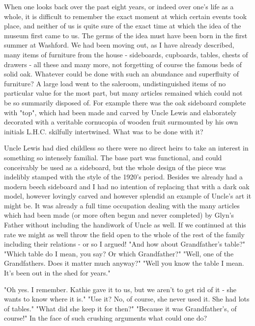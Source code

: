 
When one looks back over the past eight years, or indeed over one's life as a whole, it is difficult to remember the exact moment at which certain events took place, and neither of us is quite sure of the exact time at which the idea of the museum first came to us. The germs of the idea must have been born in the first summer at Washford. We had been moving out, as I have already described, many items of furniture from the house - sideboards, cupboards, tables, chests of drawers - all these and many more, not forgetting of course the famous beds of solid oak. Whatever could be done with such an abundance and superfluity of furniture? A large load went to the saleroom, undistinguished items of no particular value for the most part, but many articles remained which could not be so summarily disposed of. For example there was the oak sideboard complete with "top", which had been made and carved by Uncle Lewis and elaborately decorated with a veritable cornucopia of wooden fruit surmounted by his own initials L.H.C. skilfully intertwined. What was to be done with it?

Uncle Lewis had died childless so there were no direct heirs to take an interest in something so intensely familial. The base part was functional, and could conceivably be used as a sideboard, but the whole design of the piece was indelibly stamped with the style of the 1920's period. Besides we already had a modern beech sideboard and I had no intention of replacing that with a dark oak model, however lovingly carved and however splendid an example of Uncle's art it might be. It was already a full time occupation dealing with the many articles which had been made (or more often begun and never completed) by Glyn's Father without including the handiwork of Uncle as well. If we continued at this rate we might as well throw the field open to the whole of the rest of the family including their relations - or so I argued! "And how about Grandfather's table?" "Which table do I mean, you say? Or which Grandfather?" "Well, one of the Grandfathers. Does it matter much anyway?" "Well you know the table I mean. It's been out in the shed for years."

"Oh yes. I remember. Kathie gave it to us, but we aren't to get rid of it - she wants to know where it is."
"Use it? No, of course, she never used it. She had lots of tables."
"What did she keep it for then?"
"Because it was Grandfather's, of course!"
In the face of such crushing arguments what could one do?

